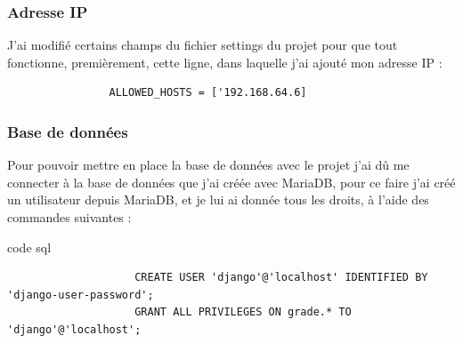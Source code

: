 \documentclass[12pt, a4paper]{article}
\begin{document}
            \subsubsection{Adresse IP}
            J’ai modifié certains champs du fichier settings du projet pour que tout fonctionne, premièrement, cette ligne, dans laquelle j’ai ajouté mon adresse IP : 
            \begin{lstlisting}
                ALLOWED_HOSTS = ['192.168.64.6]
            \end{lstlisting}
            \subsubsection{Base de données}
            Pour pouvoir mettre en place la base de données avec le projet j’ai dû me connecter à la base de données que j’ai créée avec MariaDB, pour ce faire j’ai créé un utilisateur depuis MariaDB, et je lui ai donnée tous les droits, à l’aide des commandes suivantes :
            \begin{listing}[H]
                \caption{code sql}
                \label{lst:sql}
                \begin{verbatim}
                    CREATE USER 'django'@'localhost' IDENTIFIED BY 'django-user-password';
                    GRANT ALL PRIVILEGES ON grade.* TO  'django'@'localhost';
                \end{verbatim}
            \end{listing}
            
\end{document}

